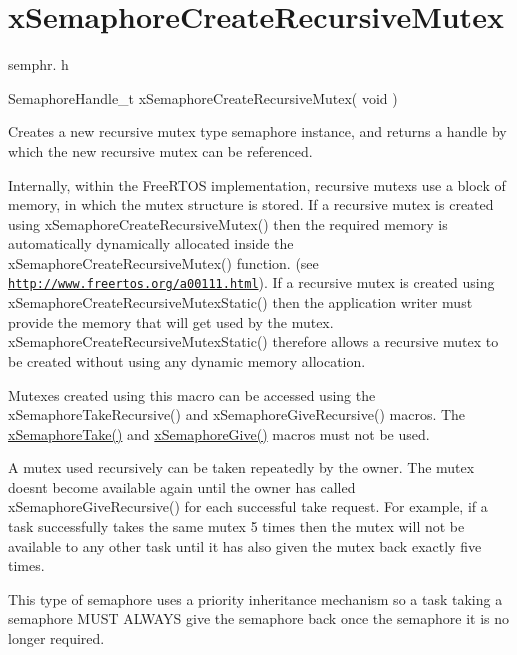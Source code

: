 \hypertarget{group__x_semaphore_create_recursive_mutex}{}\section{x\+Semaphore\+Create\+Recursive\+Mutex}
\label{group__x_semaphore_create_recursive_mutex}
semphr. h 
\begin{DoxyPre}SemaphoreHandle\_t xSemaphoreCreateRecursiveMutex( void )\end{DoxyPre}


Creates a new recursive mutex type semaphore instance, and returns a handle by which the new recursive mutex can be referenced.

Internally, within the Free\+R\+T\+OS implementation, recursive mutexs use a block of memory, in which the mutex structure is stored. If a recursive mutex is created using x\+Semaphore\+Create\+Recursive\+Mutex() then the required memory is automatically dynamically allocated inside the x\+Semaphore\+Create\+Recursive\+Mutex() function. (see \href{http://www.freertos.org/a00111.html}{\tt http\+://www.\+freertos.\+org/a00111.\+html}). If a recursive mutex is created using x\+Semaphore\+Create\+Recursive\+Mutex\+Static() then the application writer must provide the memory that will get used by the mutex. x\+Semaphore\+Create\+Recursive\+Mutex\+Static() therefore allows a recursive mutex to be created without using any dynamic memory allocation.

Mutexes created using this macro can be accessed using the x\+Semaphore\+Take\+Recursive() and x\+Semaphore\+Give\+Recursive() macros. The \hyperlink{semphr_8h_af116e436d2a5ae5bd72dbade2b5ea930}{x\+Semaphore\+Take()} and \hyperlink{semphr_8h_aae55761cabfa9bf85c8f4430f78c0953}{x\+Semaphore\+Give()} macros must not be used.

A mutex used recursively can be \textquotesingle{}taken\textquotesingle{} repeatedly by the owner. The mutex doesn\textquotesingle{}t become available again until the owner has called x\+Semaphore\+Give\+Recursive() for each successful \textquotesingle{}take\textquotesingle{} request. For example, if a task successfully \textquotesingle{}takes\textquotesingle{} the same mutex 5 times then the mutex will not be available to any other task until it has also \textquotesingle{}given\textquotesingle{} the mutex back exactly five times.

This type of semaphore uses a priority inheritance mechanism so a task \textquotesingle{}taking\textquotesingle{} a semaphore M\+U\+ST A\+L\+W\+A\+YS \textquotesingle{}give\textquotesingle{} the semaphore back once the semaphore it is no longer required.


